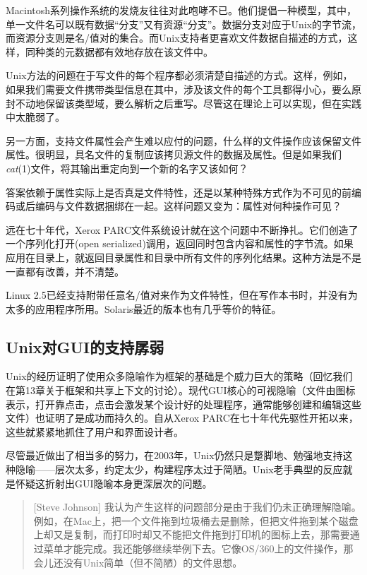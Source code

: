 \documentclass[12pt,oneside]{ctexbook}
\begin{document}
\begin{common-format}
Macintosh系列操作系统的发烧友往往对此咆哮不已。他们提倡一种模型，其中，单一文件名可以既有数据“分支”又有资源“分支”。数据分支对应于Unix的字节流，而资源分支则是名/值对的集合。而Unix支持者更喜欢文件数据自描述的方式，这样，同种类的元数据都有效地存放在该文件中。

Unix方法的问题在于写文件的每个程序都必须清楚自描述的方式。这样，例如，如果我们需要文件携带类型信息在其中，涉及该文件的每个工具都得小心，要么原封不动地保留该类型域，要么解析之后重写。尽管这在理论上可以实现，但在实践中太脆弱了。

另一方面，支持文件属性会产生难以应付的问题，什么样的文件操作应该保留文件属性。很明显，具名文件的复制应该拷贝源文件的数据及属性。但是如果我们\textit{cat}(1)文件，将其输出重定向到一个新的名字又该如何？

答案依赖于属性实际上是否真是文件特性，还是以某种特殊方式作为不可见的前编码或后编码与文件数据捆绑在一起。这样问题又变为：属性对何种操作可见？

远在七十年代，Xerox PARC文件系统设计就在这个问题中不断挣扎。它们创造了一个序列化打开(open serialized)调用，返回同时包含内容和属性的字节流。如果应用在目录上，就返回目录属性和目录中所有文件的序列化结果。这种方法是不是一直都有改善，并不清楚。

Linux 2.5已经支持附带任意名/值对来作为文件特性，但在写作本书时，并没有为太多的应用程序所用。Solaris最近的版本也有几乎等价的特征。

\subsection{Unix对GUI的支持孱弱}
Unix的经历证明了使用众多隐喻作为框架的基础是个威力巨大的策略（回忆我们在第13章关于框架和共享上下文的讨论）。现代GUI核心的可视隐喻（文件由图标表示，打开靠点击，点击会激发某个设计好的处理程序，通常能够创建和编辑这些文件）也证明了是成功而持久的。自从Xerox PARC在七十年代先驱性开拓以来，这些就紧紧地抓住了用户和界面设计者。

尽管最近做出了相当多的努力，在2003年，Unix仍然只是蹩脚地、勉强地支持这种隐喻——层次太多，约定太少，构建程序太过于简陋。Unix老手典型的反应就是怀疑这折射出GUI隐喻本身更深层次的问题。

\begin{quote}[Steve Johnson]
我认为产生这样的问题部分是由于我们仍未正确理解隐喻。例如，在Mac上，把一个文件拖到垃圾桶去是删除，但把文件拖到某个磁盘上却又是复制，而打印时却又不能把文件拖到打印机的图标上去，那需要通过菜单才能完成。我还能够继续举例下去。它像OS/360上的文件操作，那会儿还没有Unix简单（但不简陋）的文件思想。
\end{quote}


\end{common-format}
\end{document}
